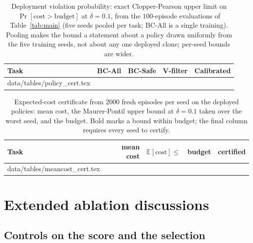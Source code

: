 \documentclass{article} %
\makeatletter
\newcommand{\tabinput}[1]{\@@input#1 }
\makeatother
\begin{document}
\begin{table}[h]
\caption{Deployment violation probability: exact Clopper-Pearson upper limit on
$\Pr[\text{cost} > \text{budget}]$ at $\delta = 0.1$, from the $100$-episode evaluations
of Table~\ref{tab:main} (five seeds pooled per task; BC-All is a single training).
Pooling makes the bound a statement about a policy drawn uniformly from the five
training seeds, not about any one deployed clone; per-seed bounds are wider.}
\label{tab:policycert}
\begin{center}
\scriptsize
\begin{tabular}{l rrrr}
\toprule
Task & BC-All & BC-Safe & V-filter & Calibrated \\
\midrule
\tabinput{data/tables/policy_cert.tex}
\bottomrule
\end{tabular}
\end{center}
\end{table}

\begin{table}[h]
\caption{Expected-cost certificate from $2000$ fresh episodes per seed on the deployed
policies: mean cost, the Maurer-Pontil upper bound at $\delta = 0.1$ taken over the
worst seed, and the budget. Bold marks a bound within budget; the final column requires
every seed to certify.}
\label{tab:meancostcert}
\begin{center}
\scriptsize
\begin{tabular}{l rrrc}
\toprule
Task & mean cost & $\mathbb{E}[\text{cost}] \le$ & budget & certified \\
\midrule
\tabinput{data/tables/meancost_cert.tex}
\bottomrule
\end{tabular}
\end{center}
\end{table}

\section{Extended ablation discussions}
\label{app:extended}

\subsection{Controls on the score and the selection}
\end{document}
